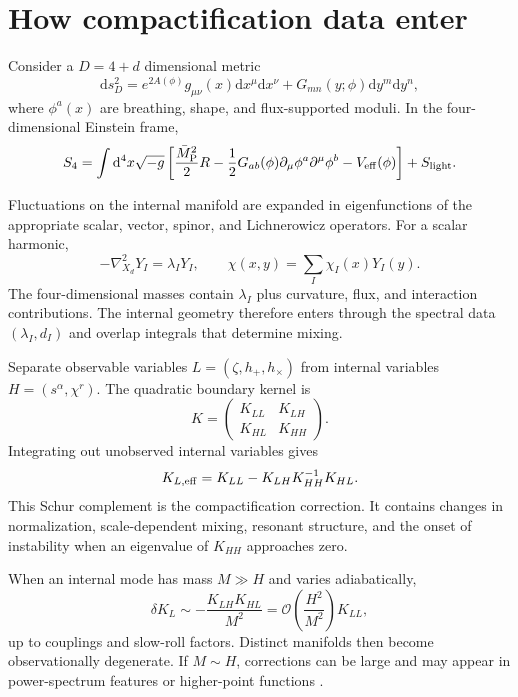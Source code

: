 \documentclass[aps,prd,twocolumn,superscriptaddress,nofootinbib,longbibliography]{revtex4-2}
\newcommand{\Mpl}{\bar M_{\rm P}}
\newcommand{\dd}{\mathrm d}
\begin{document}
\section{How compactification data enter}
\label{sec:compactification}

Consider a $D=4+d$ dimensional metric
\begin{equation}
\dd s_D^2=e^{2A(\phi)}g_{\mu\nu}(x)\dd x^\mu\dd x^\nu+G_{mn}(y;\phi)\dd y^m\dd y^n,
\end{equation}
where $\phi^a(x)$ are breathing, shape, and flux-supported moduli. In the four-dimensional Einstein frame,
\begin{equation}
S_4=\int\dd^4x\sqrt{-g}\left[\frac{\Mpl^2}{2}R-
\frac12G_{ab}(\phi)\partial_\mu\phi^a\partial^\mu\phi^b-V_{\rm eff}(\phi)\right]+S_{\rm light}.
\label{eq:einstframe}
\end{equation}

Fluctuations on the internal manifold are expanded in eigenfunctions of the appropriate scalar, vector, spinor, and Lichnerowicz operators. For a scalar harmonic,
\begin{equation}
-\nabla_{X_d}^2Y_I=\lambda_IY_I,\qquad
\chi(x,y)=\sum_I\chi_I(x)Y_I(y).
\end{equation}
The four-dimensional masses contain $\lambda_I$ plus curvature, flux, and interaction contributions. The internal geometry therefore enters through the spectral data $(\lambda_I,d_I)$ and overlap integrals that determine mixing.

Separate observable variables $L=(\zeta,h_+,h_\times)$ from internal variables $H=(s^\alpha,\chi^r)$. The quadratic boundary kernel is
\begin{equation}
K=\begin{pmatrix}K_{LL}&K_{LH}\\K_{HL}&K_{HH}\end{pmatrix}.
\end{equation}
Integrating out unobserved internal variables gives
\begin{equation}
K_{L,\rm eff}=K_{LL}-K_{LH}K_{HH}^{-1}K_{HL}.
\label{eq:schur}
\end{equation}
This Schur complement is the compactification correction. It contains changes in normalization, scale-dependent mixing, resonant structure, and the onset of instability when an eigenvalue of $K_{HH}$ approaches zero.

When an internal mode has mass $M\gg H$ and varies adiabatically,
\begin{equation}
\delta K_L\sim-\frac{K_{LH}K_{HL}}{M^2}
=\mathcal O\left(\frac{H^2}{M^2}\right)K_{LL},
\end{equation}
up to couplings and slow-roll factors. Distinct manifolds then become observationally degenerate. If $M\sim H$, corrections can be large and may appear in power-spectrum features or higher-point functions \cite{ArkaniHamedMaldacena2015}.
\end{document}
